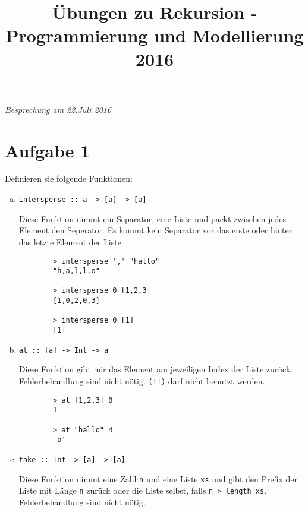 \documentclass{article}
\title{Übungen zu Rekursion - Programmierung und Modellierung 2016}
\begin{document}
\maketitle

\begin{center}
\textit{Besprechung am 22.Juli 2016}
\end{center}

\section*{Aufgabe 1}
Definieren sie folgende Funktionen:
\begin{enumerate} [a)]
    \item \begin{verbatim}
intersperse :: a -> [a] -> [a]
          \end{verbatim}
    Diese Funktion nimmt ein Separator, eine Liste und packt zwischen jedes Element den Seperator. Es kommt kein Separator vor das erste oder hinter das letzte Element der Liste.
    
    \begin{verbatim}
        > intersperse ',' "hallo"
        "h,a,l,l,o"
        
        > intersperse 0 [1,2,3]
        [1,0,2,0,3]
        
        > intersperse 0 [1]
        [1]
    \end{verbatim}

    \item \begin{verbatim}
at :: [a] -> Int -> a
          \end{verbatim}
    Diese Funktion gibt mir das Element am jeweiligen Index der Liste zurück. \\
    Fehlerbehandlung sind nicht nötig. \texttt{(!!)} darf nicht benutzt werden. \\

    \begin{verbatim}
        > at [1,2,3] 0
        1

        > at "hallo" 4
        'o'
    \end{verbatim}

\newpage
    \item \begin{verbatim}
take :: Int -> [a] -> [a]
          \end{verbatim}
    Diese Funktion nimmt eine Zahl \texttt{n} und eine Liste \texttt{xs} und gibt den Prefix der Liste mit Länge \texttt{n} zurück
    oder die Liste selbst, falls \texttt{n > length xs}. Fehlerbehandlung sind nicht nötig. \\


\end{enumerate}
\end{document}
